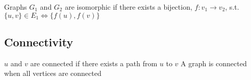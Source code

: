 \begin{definition}[isomorphic]
	\label{def:isomorphic}
	Graphs \(G_1\) and \(G_2\) are isomorphic if there exists a bijection, \(f: v_1 \to v_2\), s.t. \(\{u, v\} \in E_1 \iff \{f(u), f(v)\}\) 
\end{definition}

\subsection{Connectivity}
\begin{definition}[connected]
	\label{def:connected}
	\(u\) and \(v\) are connected if there exists a path from \(u\) to \(v\)
	A graph is connected when all vertices are connected   
\end{definition}

